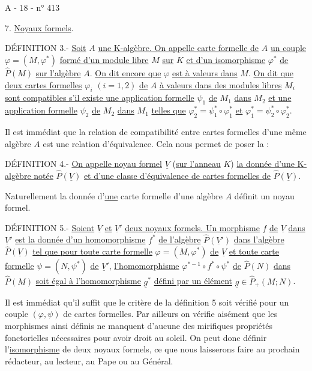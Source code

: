 A - 18 - \hfill n° 413

7. \uline{Noyaux formels}.

DÉFINITION 3.- \uline{Soit} $A$ \uline{une K-algèbre. On appelle carte formelle de} $A$ \uline{un couple} $\varphi=(M,\varphi^*)$ \uline{formé d'un module libre} $M$ \uline{sur} $K$ \uline{et d'un isomorphisme} $\varphi^*$ \uline{de} $\widehat P(M)$ \uline{sur l'algèbre} $A$. \uline{On dit encore que} $\varphi$ \uline{est à valeurs dans} $M$. \uline{On dit que deux cartes formelles} $\varphi_i$ $(i=1,2)$ \uline{de} $A$ \uline{à valeurs dans des modules libres} $M_i$ \uline{sont compatibles s'il existe une application formelle} $\psi_1$ \uline{de} $M_1$ \uline{dans} $M_2$ \uline{et une application formelle} $\psi_2$ \uline{de} $M_2$ \uline{dans} $M_1$ \uline{telles que} $\varphi_2^*=\psi_1^*\circ\varphi_1^*$ \uline{et} $\varphi_1^*=\psi_2^*\circ\varphi_2^*$.

Il est immédiat que la relation de compatibilité entre cartes formelles d'une même algèbre $A$ est une relation d'équivalence. Cela nous permet de poser la :

DÉFINITION 4.- \uline{On appelle noyau formel} $\underline V$ (\uline{sur l'anneau} $K$) \uline{la donnée d'une K-algèbre notée} $\widehat P(\underline V)$ \uline{et d'une classe d'équivalence de cartes formelles de} $\widehat P(\underline V)$.

Naturellement la donnée d'\uline{une} carte formelle d'une algèbre $A$ définit un noyau formel.

DÉFINITION 5.- \uline{Soient} $\underline V$ \uline{et} $\underline V'$ \uline{deux noyaux formels. Un morphisme} $f$ \uline{de} $\underline V$ \uline{dans} $\underline V'$ \uline{est la donnée d'un homomorphisme} $f^*$ \uline{de l'algèbre} $\widehat P(\underline V')$ \uline{dans l'algèbre} $\widehat P(\underline V)$ \uline{tel que pour toute carte formelle} $\varphi=(M,\varphi^*)$ \uline{de} $\underline V$ \uline{et toute carte formelle} $\psi=(N,\psi^*)$ \uline{de} $\underline V'$, \uline{l'homomorphisme} $\varphi^{*-1}\circ f^*\circ\psi^*$ \uline{de} $\widehat P(N)$ \uline{dans} $\widehat P(M)$ \uline{soit égal à l'homomorphisme} $\underline g^*$ \uline{défini par un élément} $\underline g\in\widehat P_+(M;N)$.

Il est immédiat qu'il suffit que le critère de la définition 5 soit vérifié pour un couple $(\varphi,\psi)$ de cartes formelles. Par ailleurs on vérifie aisément que les morphismes ainsi définis ne manquent d'aucune des mirifiques propriétés fonctorielles nécessaires pour avoir droit au soleil. On peut donc définir l'\uline{isomorphisme} de deux noyaux formels, ce que nous laisserons faire au prochain rédacteur, au lecteur, au Pape ou au Général.

